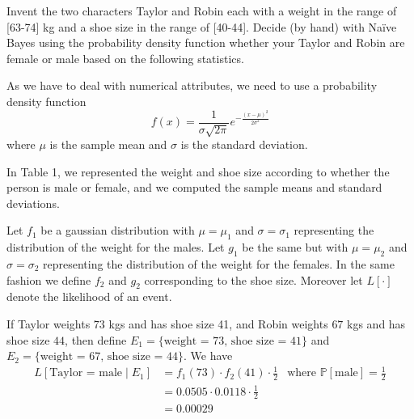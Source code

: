 \documentclass[fontsize=12pt, usenames, dvipsnames, headinclude, headsepline, footinclude, footsepline]{scrartcl}
\title{\normalfont{\bfseries{Machine Learning: Homework 3}}}
\author{Laurent \textsc{Hayez}}
\date{\today}
\renewcommand{\P}{\mathbb{P}}
\begin{document}
\renewcommand{\labelitemi}{\textbullet}



\maketitle




\begin{exo}
  Invent the two characters Taylor and Robin each with a weight in the range of [63-74] kg and a shoe size in
  the range of [40-44]. Decide (by hand) with Naïve Bayes using the probability density function whether your
  Taylor and Robin are female or male based on the following statistics.
\end{exo}

  \begin{sol}
    As we have to deal with numerical attributes, we need to use a probability density function 
    \[ f(x) = \frac{1}{\sigma \sqrt{2 \pi}} e^{-\frac{(x - \mu)^2}{2\sigma^2}} \]
    where $\mu$ is the sample mean and $\sigma$ is the standard deviation.

    In Table 1, we represented the weight and shoe size according to whether the person is male or female, and
    we computed the sample means and standard deviations. 

    Let $f_1$ be a gaussian distribution with $\mu = \mu_1$ and $\sigma = \sigma_1$ representing the
    distribution of the weight for the males. Let $g_1$ be the same but with $\mu = \mu_2$ and $\sigma =
    \sigma_2$ representing the distribution of the weight for the females. In the same fashion we define $f_2$
    and $g_2$ corresponding to the shoe size. Moreover let $L[\cdot]$ denote the likelihood of an event.

    If Taylor weights $73$ kgs and has shoe size 41, and Robin weights $67$ kgs and has shoe size $44$, then
    define $E_1 = \{\text{weight = 73, shoe size = 41}\}$ and $E_2 = \{\text{weight = 67, shoe size =
      44}\}$. We have
    \begin{align*}
      L[\text{Taylor = male} \mid E_1] &= f_1(73) \cdot f_2(41) \cdot \frac{1}{2} & \text{where }
                                                                                    \P[\text{male}] =
                                                                                    \frac{1}{2}\\
                                       &= 0.0505 \cdot 0.0118 \cdot \frac{1}{2}\\
      &= 0.00029
    \end{align*}
  \end{sol}







	
\end{document}
